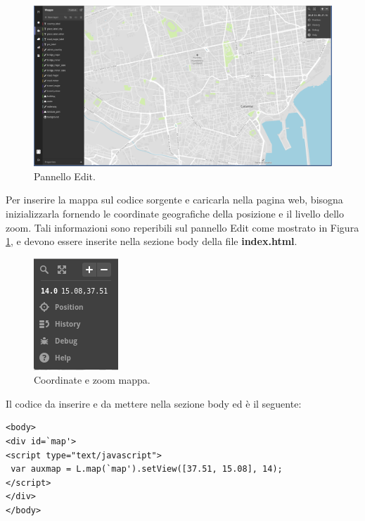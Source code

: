 \documentclass[a4paper,11pt]{article}
\begin{document}
\begin{figure}[ht]
	\centering
	\includegraphics[scale=0.26]{Edit.png}
	\caption{Pannello Edit.}
	\label{fig:7}
\end{figure}\newpage		
Per inserire la mappa sul codice sorgente e caricarla nella pagina web, bisogna inizializzarla fornendo le coordinate geografiche della posizione e il livello dello zoom. Tali informazioni sono reperibili sul pannello Edit come mostrato in  Figura \ref{fig:7}, e devono essere inserite nella sezione body della file \textbf{index.html}.
\begin{figure}[htbp]
	\centering
	\includegraphics[scale=1]{coordinate.png}
	\caption{Coordinate e zoom mappa.}
	\label{fig:8}
\end{figure}\newline

Il codice da inserire e da mettere nella sezione body ed è il seguente:

\begin{lstlisting}[style=htmlcssjs]
<body>		
<div id=`map'>
<script type="text/javascript">
 var auxmap = L.map(`map').setView([37.51, 15.08], 14);
</script>
</div>
</body>
\end{lstlisting}
				
\end{document}
